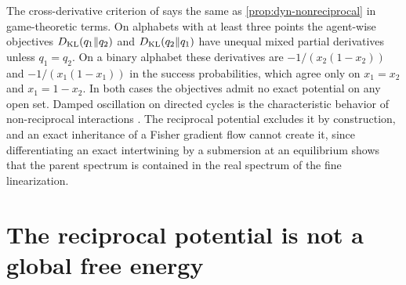 The cross-derivative criterion of \citet{MondererShapley1996} says the same as \cref{prop:dyn-nonreciprocal} in game-theoretic terms. On alphabets with at least three points the agent-wise objectives $D_{\mathrm{KL}}(q_1\Vert q_2)$ and $D_{\mathrm{KL}}(q_2\Vert q_1)$ have unequal mixed partial derivatives unless $q_1=q_2$. On a binary alphabet these derivatives are $-1/(x_2(1-x_2))$ and $-1/(x_1(1-x_1))$ in the success probabilities, which agree only on $x_1=x_2$ and $x_1=1-x_2$. In both cases the objectives admit no exact potential on any open set. Damped oscillation on directed cycles is the characteristic behavior of non-reciprocal interactions \citep{FruchartEtAl2021}. The reciprocal potential excludes it by construction, and an exact inheritance of a Fisher gradient flow cannot create it, since differentiating an exact intertwining by a submersion at an equilibrium shows that the parent spectrum is contained in the real spectrum of the fine linearization.

\section{The reciprocal potential is not a global free energy}
\label{sec:dyn-no-global}


